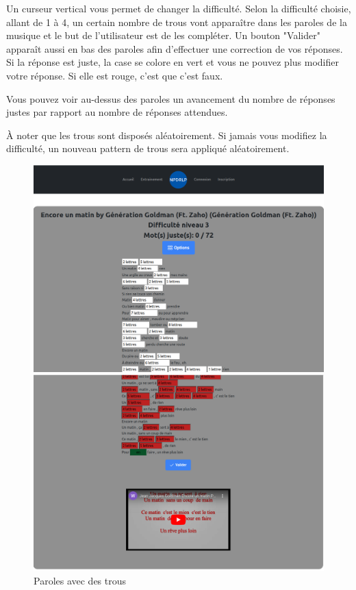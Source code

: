 \documentclass[12pt,french]{article}
\begin{document}
Un curseur vertical vous permet de changer la difficulté. Selon la difficulté choisie, allant de 1 à 4, un certain nombre de trous vont apparaître dans les paroles de la musique et le but de l'utilisateur est de les compléter. Un bouton "Valider" apparaît aussi en bas des paroles afin d'effectuer une correction de vos réponses. Si la réponse est juste, la case se colore en vert et vous ne pouvez plus modifier votre réponse. Si elle est rouge, c'est que c'est faux.

Vous pouvez voir au-dessus des paroles un avancement du nombre de réponses justes par rapport au nombre de réponses attendues.

À noter que les trous sont disposés aléatoirement. Si jamais vous modifiez la difficulté, un nouveau pattern de trous sera appliqué aléatoirement.

\begin{figure}[H]
	\centering
	\begin{minipage}{.5\textwidth}
		\centering
		\includegraphics[scale=0.15]{diffi1.png}
	\end{minipage}%
	\begin{minipage}{.5\textwidth}
		\centering
		\includegraphics[scale=0.15]{diffi2.png}
	\end{minipage}
	\caption{Paroles avec des trous}
\end{figure}
\end{document}
